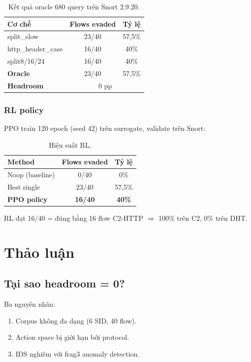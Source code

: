 \documentclass[12pt, a4paper, openany]{book}
\begin{document}
\begin{table}[htbp]
\centering
\caption{Kết quả oracle 680 query trên Snort 2.9.20.}
\begin{tabular}{lcc}
\toprule
Cơ chế & Flows evaded & Tỷ lệ \\
\midrule
split\_slow & 23/40 & 57,5\% \\
http\_header\_case & 16/40 & 40\% \\
split8/16/24 & 16/40 & 40\% \\
\midrule
\textbf{Oracle} & 23/40 & 57,5\% \\
\textbf{Headroom} & \multicolumn{2}{c}{0 pp} \\
\bottomrule
\end{tabular}
\end{table}

\subsection{RL policy}

PPO train 120 epoch (seed 42) trên surrogate, validate trên Snort:

\begin{table}[htbp]
\centering
\caption{Hiệu suất RL.}
\begin{tabular}{lcc}
\toprule
Method & Flows evaded & Tỷ lệ \\
\midrule
Noop (baseline) & 0/40 & 0\% \\
Best single & 23/40 & 57,5\% \\
\textbf{PPO policy} & \textbf{16/40} & \textbf{40\%} \\
\bottomrule
\end{tabular}
\end{table}

RL đạt 16/40 = đúng bằng 16 flow C2-HTTP $\Rightarrow$ 100\% trên C2, 0\% trên DHT.

\chapter{Thảo luận}

\section{Tại sao headroom = 0?}

Ba nguyên nhân:
\begin{enumerate}
    \item Corpus không đa dạng (6 SID, 40 flow).
    \item Action space bị giới hạn bởi protocol.
    \item IDS nghiêm với frag3 anomaly detection.
\end{enumerate}
\end{document}
